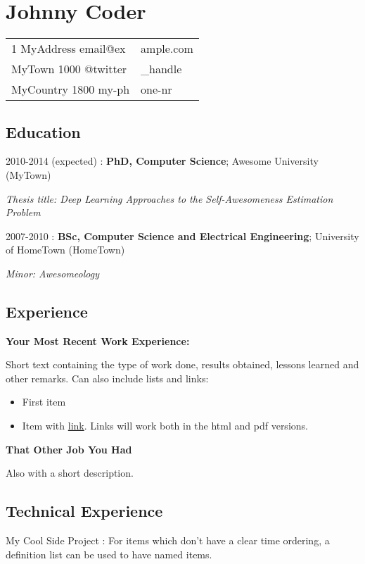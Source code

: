 \documentclass[]{article}
\date{}
\begin{document}
\section{Johnny Coder}\label{johnny-coder}

\begin{longtable}[c]{@{}ll@{}}
\toprule
1 MyAddress email@ex & ample.com\tabularnewline
MyTown 1000 @twitter & \_handle\tabularnewline
MyCountry 1800 my-ph & one-nr\tabularnewline
\bottomrule
\end{longtable}

\subsection{Education}\label{education}

2010-2014 (expected) : \textbf{PhD, Computer Science}; Awesome
University (MyTown)

\emph{Thesis title: Deep Learning Approaches to the Self-Awesomeness
Estimation Problem}

2007-2010 : \textbf{BSc, Computer Science and Electrical Engineering};
University of HomeTown (HomeTown)

\emph{Minor: Awesomeology}

\subsection{Experience}\label{experience}

\textbf{Your Most Recent Work Experience:}

Short text containing the type of work done, results obtained, lessons
learned and other remarks. Can also include lists and links:

\begin{itemize}
\item
  First item
\item
  Item with \href{http://www.example.com}{link}. Links will work both in
  the html and pdf versions.
\end{itemize}

\textbf{That Other Job You Had}

Also with a short description.

\subsection{Technical Experience}\label{technical-experience}

My Cool Side Project : For items which don't have a clear time ordering,
a definition list can be used to have named items.
\end{document}

